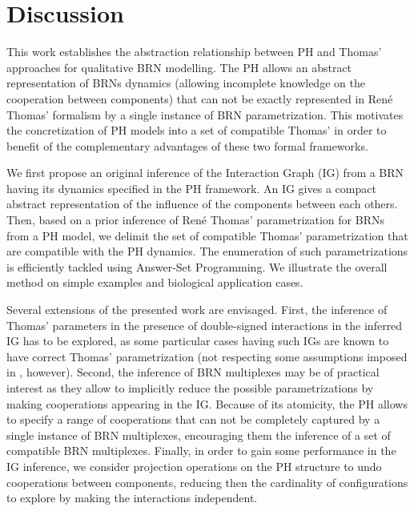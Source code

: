 \section{Discussion}

This work establishes the abstraction relationship between PH and Thomas' approaches for
qualitative BRN modelling.
The PH allows an abstract representation of BRNs dynamics (allowing incomplete knowledge on the
cooperation between components) that can not be exactly represented in Ren\'e Thomas' formalism by a
single instance of BRN parametrization.
This motivates the concretization of PH models into a set of compatible Thomas' in order to benefit
of the complementary advantages of these two formal frameworks.

We first propose an original inference of the Interaction Graph (IG) from a BRN
having its dynamics specified in the PH framework.
An IG gives a compact abstract representation of the influence of the components between each
others.
Then, based on a prior inference of Ren\'e Thomas' parametrization for BRNs from a PH model, we
delimit the set of compatible Thomas' parametrization that are compatible with the PH dynamics.
The enumeration of such parametrizations is efficiently tackled using Answer-Set Programming.
We illustrate the overall method on simple examples and biological application cases.

Several extensions of the presented work are envisaged.
First, the inference of Thomas' parameters in the presence of double-signed interactions in the
inferred IG has to be explored, as some particular cases having such IGs are known to have correct
Thomas' parametrization (not respecting some assumptions imposed in ,
however).
Second, the inference of BRN multiplexes \cite{BernotMultiplexes} may be of practical interest 
as they allow to implicitly reduce the possible parametrizations by making cooperations appearing
in the IG.
Because of its atomicity, the PH allows to specify a range of cooperations that can not be
completely captured by a single instance of BRN multiplexes, encouraging them the inference of a set
of compatible BRN multiplexes.
Finally, in order to gain some performance in the IG inference, we consider projection operations on
the PH structure to undo cooperations between components, reducing then the cardinality of
configurations to explore by making the interactions independent.

